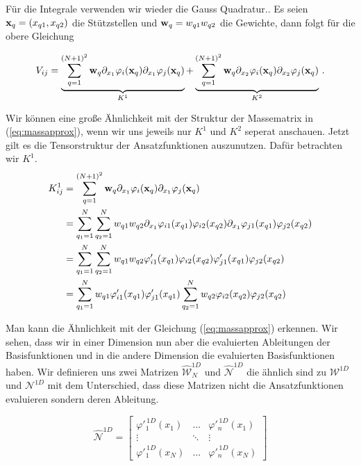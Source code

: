 Für die Integrale verwenden wir wieder die Gauss Quadratur.. Es seien $\bold{x}_q=(x_{q1},x_{q2})$ die Stützstellen und $\bold{w}_q=w_{q1}w_{q2}$ die Gewichte, dann folgt für die obere Gleichung

\begin{equation}
\begin{aligned}
V_{ij}  = \underbrace{\sum\limits_{q=1}^{(N+1)^2} \bold{w}_q \partial_{x_1}  \varphi_i(\bold{x}_q)  \partial_{x_1} \varphi_j (\bold{x}_q)}_{K^1} + \underbrace{\sum\limits_{q=1}^{(N+1)^2} \bold{w}_q  \partial_{x_2} \varphi_i(\bold{x}_q)  \partial_{x_2} \varphi_j(\bold{x}_q)}_{K^2} \, .
\end{aligned}
\end{equation}

Wir können eine große Ähnlichkeit mit der Struktur der Massematrix in (\ref{eq:massapprox}), wenn wir uns jeweils nur $K^1$ und $K^2$ seperat anschauen. Jetzt gilt es die Tensorstruktur der Ansatzfunktionen auszunutzen. Dafür betrachten wir $K^1$.
\begin{equation}
\begin{aligned}
K_{ij}^1 &=\sum\limits_{q=1}^{(N+1)^2} \bold{w}_q \partial_{x_1}  \varphi_i(\bold{x}_q)  \partial_{x_1} \varphi_j (\bold{x}_q) \\ &= \sum\limits_{q_1=1}^{N} \sum\limits_{q_2=1}^{N} w_{q1}w_{q2} \partial_{x_1}  \varphi_{i1}(x_{q1})\varphi_{i2}(x_{q2})  \partial_{x_1} \varphi_{j1} (x_{q1})\varphi_{j2} (x_{q2}) \\
&=  \sum\limits_{q_1=1}^{N} \sum\limits_{q_2=1}^{N} w_{q1}w_{q2} \varphi'_{i1}(x_{q1})\varphi_{i2}(x_{q2})  \varphi'_{j1} (x_{q1})\varphi_{j2} (x_{q2}) \\ 
&= \sum\limits_{q_1=1}^{N} w_{q1} \varphi'_{i1}(x_{q1}) \varphi'_{j1} (x_{q1}) \sum\limits_{q_2=1}^{N} w_{q2} \varphi_{i2}(x_{q2})  \varphi_{j2} (x_{q2}) 
\end{aligned}
\end{equation}

Man kann die Ähnlichkeit mit der Gleichung (\ref{eq:massapprox}) erkennen. Wir sehen, dass wir in einer Dimension nun aber die evaluierten Ableitungen der Basisfunktionen und in die andere Dimension die evaluierten Basisfunktionen haben.
Wir definieren uns zwei Matrizen $\widehat{\mathcal{W}}^{1D}_N$ und $\widehat{\mathcal{N}}^{1D}$ die ähnlich sind zu $\mathcal{W}^{1D}$ und $\mathcal{N}^{1D}$ mit dem Unterschied, dass diese Matrizen nicht die Ansatzfunktionen evaluieren sondern deren Ableitung.

\begin{equation}
\widehat{\mathcal{N}}^{1D} = 
\begin{bmatrix}
\varphi'^{ \, 1D}_1(x_1) & \hdots &  \varphi'^{ \, 1D}_n(x_1) \\
\vdots & \ddots & \vdots \\
\varphi'^{ \, 1D}_1(x_N)& \hdots & \varphi'^{ \, 1D}_n(x_N)
\end{bmatrix}
\end{equation}

